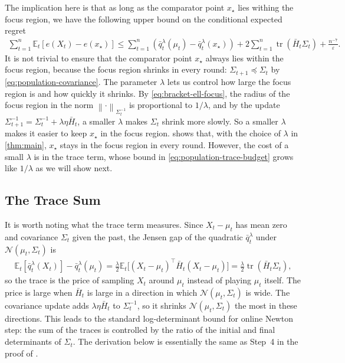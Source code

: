 \documentclass[12pt,cleveref]{jmlr}
\newcommand{\E}{\mathbb E}
\newcommand{\N}{\mathcal N}
\newcommand{\tr}{\operatorname{tr}}
\newcommand{\1}{\mathbf 1}
\newcommand{\eps}{\varepsilon}
\newcommand{\normm}[2]{\left\lVert #1\right\rVert_{#2}}
\begin{document}
The implication here is that as long as the comparator point $x_\star$ lies withing the focus region, we have the following upper bound on the conditional expected regret
\begin{align}
    \sum_{t=1}^n \E_t[e(X_t) - e(x_\star)]
    \leq
    \sum_{t=1}^n (\bar{q}_t^\lambda(\mu_t) - \bar{q}_t^\lambda(x_\star))
    + 2 \sum_{t=1}^n \tr(\bar{H}_t\Sigma_t)
    +\frac{n^{-7}}{\eps}.
    \label{eq:bracket-ell-regret-sum}
\end{align}
It is not trivial to ensure that the comparator point $x_\star$ always lies within the focus region, because the focus region shrinks in every round: $\Sigma_{t+1}\preceq\Sigma_t$ by \cref{eq:population-covariance}.
The parameter $\lambda$ lets us control how large the focus region is and how quickly it shrinks.
By \cref{eq:bracket-ell-focus}, the radius of the focus region in the norm $\normm{\cdot}{\Sigma_t^{-1}}$ is proportional to $1/\lambda$, and by the update $\Sigma_{t+1}^{-1}=\Sigma_t^{-1}+\lambda\eta\bar H_t$, a smaller $\lambda$ makes $\Sigma_t$ shrink more slowly.
So a smaller $\lambda$ makes it easier to keep $x_\star$ in the focus region.
 shows that, with the choice of $\lambda$ in \cref{thm:main}, $x_\star$ stays in the focus region in every round.
However, the cost of a small $\lambda$ is in the trace term, whose bound in \cref{eq:population-trace-budget} grows like $1/\lambda$ as we will show next.

\subsection{The Trace Sum}
It is worth noting what the trace term measures.
Since $X_t-\mu_t$ has mean zero and covariance $\Sigma_t$ given the past, the Jensen gap of the quadratic $\bar q_t^\lambda$ under $\N(\mu_t,\Sigma_t)$ is
\begin{align}
    \E_t[\bar q_t^\lambda(X_t)]-\bar q_t^\lambda(\mu_t)
    =\frac\lambda2\E_t\bigl[(X_t-\mu_t)^\top\bar H_t(X_t-\mu_t)\bigr]
    =\frac\lambda2\tr(\bar H_t\Sigma_t),
\end{align}
so the trace is the price of sampling $X_t$ around $\mu_t$ instead of playing $\mu_t$ itself.
The price is large when $\bar H_t$ is large in a direction in which $\N(\mu_t,\Sigma_t)$ is wide.
The covariance update adds $\lambda\eta\bar H_t$ to $\Sigma_t^{-1}$, so it shrinks $\N(\mu_t,\Sigma_t)$ the most in these directions.
This leads to the standard log-determinant bound for online Newton step: the sum of the traces is controlled by the ratio of the initial and final determinants of $\Sigma_t$.
The derivation below is essentially the same as Step~4 in the proof of \citet[Theorem~10.8]{lattimore2026bandit}.
\end{document}
